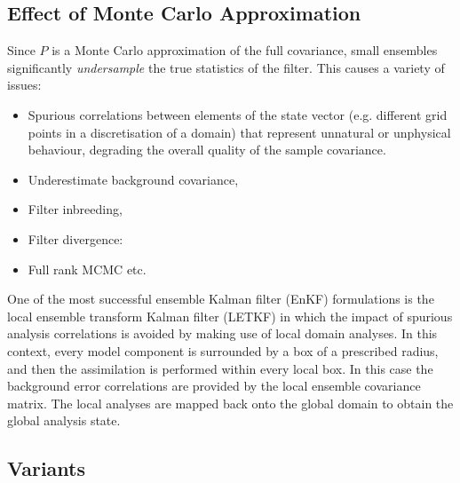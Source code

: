 

\begin{remark}
\end{remark}

\subsection{Effect of Monte Carlo Approximation}


Since $P$ is a Monte Carlo approximation of the full covariance, small ensembles significantly
\emph{undersample} the true statistics of the filter. This causes a variety of issues:
\begin{itemize}
    \item Spurious correlations between elements of the state vector (e.g. different
    grid points in a discretisation of a domain) that represent unnatural or unphysical behaviour,
    degrading the overall quality of the sample covariance.
    \item Underestimate background covariance,
    \item Filter inbreeding,
    \item Filter divergence:
    \item Full rank MCMC etc.
\end{itemize}

One of the most successful ensemble Kalman filter (EnKF) formulations is the local
ensemble transform Kalman filter (LETKF) in which the impact of spurious analysis
correlations is avoided by making use of local domain analyses. In this context, every
model component is surrounded by a box of a prescribed radius, and then the
assimilation is performed within every local box. In this case the background error
correlations are provided by the local ensemble covariance matrix. The local analyses
are mapped back onto the global domain to obtain the global analysis state.

\subsection{Variants}

